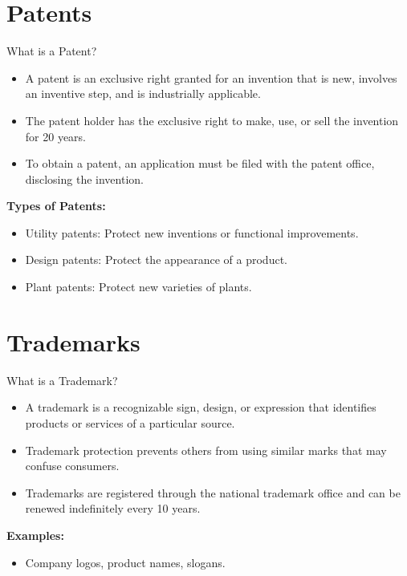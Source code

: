 \documentclass{beamer}
\begin{document}
	\section{Patents}
	\begin{frame}{What is a Patent?}
		\begin{itemize}
			\item A patent is an exclusive right granted for an invention that is new, involves an inventive step, and is industrially applicable.
			\item The patent holder has the exclusive right to make, use, or sell the invention for 20 years.
			\item To obtain a patent, an application must be filed with the patent office, disclosing the invention.
		\end{itemize}
		\vspace{0.5cm}
		\textbf{Types of Patents:}
		\begin{itemize}
			\item Utility patents: Protect new inventions or functional improvements.
			\item Design patents: Protect the appearance of a product.
			\item Plant patents: Protect new varieties of plants.
		\end{itemize}
	\end{frame}
	
	\section{Trademarks}
	\begin{frame}{What is a Trademark?}
		\begin{itemize}
			\item A trademark is a recognizable sign, design, or expression that identifies products or services of a particular source.
			\item Trademark protection prevents others from using similar marks that may confuse consumers.
			\item Trademarks are registered through the national trademark office and can be renewed indefinitely every 10 years.
		\end{itemize}
		\vspace{0.5cm}
		\textbf{Examples:}
		\begin{itemize}
			\item Company logos, product names, slogans.
		\end{itemize}
	\end{frame}
	
\end{document}
